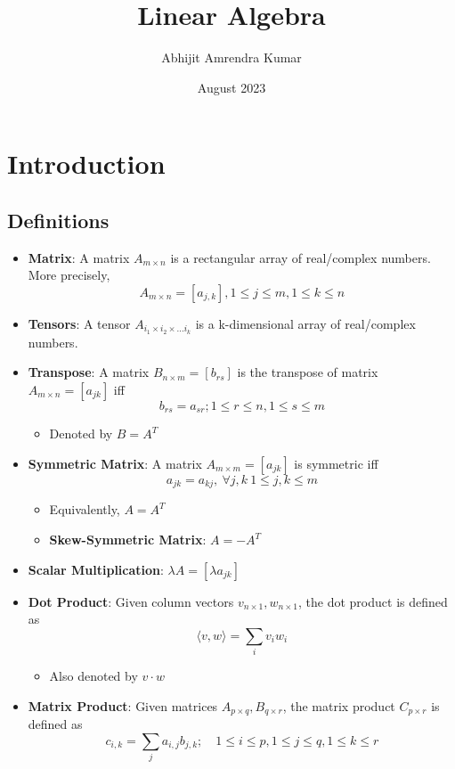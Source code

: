 \documentclass{report}
\title{Linear Algebra}
\author{Abhijit Amrendra Kumar}
\date{August 2023}
\begin{document}
\maketitle

\chapter{Introduction}
\section{Definitions}
\begin{itemize}
  \item \textbf{Matrix}: A matrix $A_{m \times n}$ is a rectangular array of real/complex numbers. More precisely, $$A_{m \times n} = [a_{j,k}], 1 \leq j \leq m, 1 \leq k \leq n$$
  \item \textbf{Tensors}: A tensor $A_{i_1\times i_2 \times ...i_k}$ is a k-dimensional array of real/complex numbers. \item \textbf{Transpose}: A matrix $B_{n \times m} = [b_{rs}]$ is the transpose of matrix $A_{m \times n} = [a_{jk}]$ iff $$b_{rs} = a_{sr}; 1 \leq r \leq n, 1 \leq s \leq m$$
        \begin{itemize}
          \item Denoted by $B = A^T$
        \end{itemize}
  \item \textbf{Symmetric Matrix}: A matrix $A_{m \times m} = [a_{jk}]$ is symmetric iff $$a_{jk} = a_{kj}, \ \forall j,k \ 1 \leq j,k \leq m$$
        \begin{itemize}
          \item Equivalently, $A = A^T$
          \item \textbf{Skew-Symmetric Matrix}: $A = -A^T$
        \end{itemize}
  \item \textbf{Scalar Multiplication}: $\lambda A = [\lambda a_{jk}]$
  \item \textbf{Dot Product}: Given column vectors $v_{n \times 1}, w_{n \times 1}$, the dot product is defined as $$\langle v,w \rangle = \underset{i}{\sum} v_iw_i$$
        \begin{itemize}
          \item Also denoted by $v \cdot w$
        \end{itemize}
  \item \textbf{Matrix Product}: Given matrices $A_{p \times q}, B_{q \times r}$, the matrix product $C_{p \times r}$ is defined as $$c_{i,k} = \underset{j}{\sum} a_{i,j}b_{j,k}; \quad 1 \leq i \leq p, 1 \leq j \leq q, 1 \leq k \leq r$$

\end{itemize}
\end{document}
